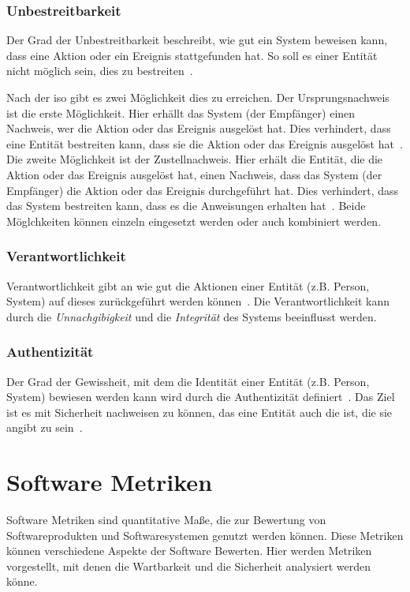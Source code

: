 \documentclass[12pt, a4paper, ngerman]{article}
\begin{document}
\subsubsection{Unbestreitbarkeit}

Der Grad der Unbestreitbarkeit beschreibt, wie gut ein System beweisen kann, 
dass eine Aktion oder ein Ereignis stattgefunden hat.
So soll es einer Entität nicht möglich sein, dies zu bestreiten~\cite{ISO25010}.

Nach der \ac{iso} gibt es zwei Möglichkeit dies zu erreichen.
Der Ursprungsnachweis ist die erste Möglichkeit. 
Hier erhällt das System (der Empfänger) einen Nachweis, wer die Aktion oder das Ereignis ausgelöst hat.
Dies verhindert, dass eine Entität bestreiten kann, dass sie die Aktion oder das Ereignis ausgelöst hat~\cite{ISO7498-2}.
Die zweite Möglichkeit ist der Zustellnachweis.
Hier erhält die Entität, die die Aktion oder das Ereignis ausgelöst hat, 
einen Nachweis, dass das System (der Empfänger) die Aktion oder das Ereignis durchgeführt hat.
Dies verhindert, dass das System bestreiten kann, dass es die Anweisungen erhalten hat~\cite{ISO7498-2}.
Beide Möglchkeiten können einzeln eingesetzt werden oder auch kombiniert werden.

\subsubsection{Verantwortlichkeit}

Verantwortlichkeit gibt an wie gut die Aktionen einer Entität (z.B. Person, System) auf dieses zurückgeführt werden können~\cite{ISO25010}.
Die Verantwortlichkeit kann durch die \emph{Unnachgibigkeit} und die \emph{Integrität} des Systems beeinflusst werden. 

\subsubsection{Authentizität}
Der Grad der Gewissheit, mit dem die Identität einer Entität (z.B. Person, System) 
bewiesen werden kann wird durch die Authentizität definiert~\cite{ISO25010}.
Das Ziel ist es mit Sicherheit nachweisen zu können, das eine Entität auch die ist, die sie angibt zu sein~\cite{ISO27000}.

\section{Software Metriken}

Software Metriken sind quantitative Maße,
die zur Bewertung von Softwareprodukten und Softwaresystemen
genutzt werden können.
Diese Metriken können verschiedene Aspekte der Software Bewerten.
Hier werden Metriken vorgestellt,
mit denen die Wartbarkeit und die Sicherheit
analysiert werden könne.
\end{document}
